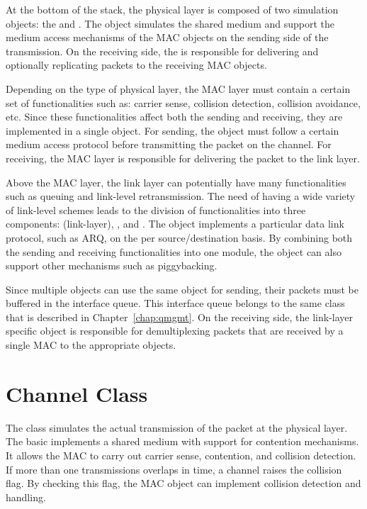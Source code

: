 At the bottom of the stack, the physical layer is composed of two
simulation objects: the  and .  The
 object simulates the shared medium and support the medium
access mechanisms of the MAC objects on the sending side of the
transmission.  On the receiving side, the  is
responsible for delivering and optionally replicating packets to the
receiving MAC objects.

Depending on the type of physical layer, the MAC layer must contain a
certain set of functionalities such as: carrier sense, collision
detection, collision avoidance, etc.  Since these functionalities affect
both the sending and receiving, they are implemented in a single
 object.  For sending, the  object must follow a certain
medium access protocol before transmitting the packet on the channel.
For receiving, the MAC layer is responsible for delivering the packet to
the link layer.

Above the MAC layer, the link layer can potentially have many
functionalities such as queuing and link-level retransmission.  The need
of having a wide variety of link-level schemes leads to the division of
functionalities into three components:  (link-layer),
, and .  The  object implements
a particular data link protocol, such as ARQ, on the per
source/destination basis.  By combining both the sending and receiving
functionalities into one module, the  object can also support
other mechanisms such as piggybacking.

Since multiple  objects can use the same  object for
sending, their packets must be buffered in the interface queue.  This
interface queue belongs to the same  class that is described
in Chapter~\ref{chap:qmgmt}.  On the receiving side, the link-layer
specific  object is responsible for demultiplexing
packets that are received by a single MAC to the appropriate 
objects.


\section{Channel Class}
\label{sec:channel}

The  class simulates the actual transmission of the packet
at the physical layer.  The basic  implements a shared
medium with support for contention mechanisms.  It allows the MAC to
carry out carrier sense, contention, and collision detection.  If more
than one transmissions overlaps in time, a channel raises the collision
flag.  By checking this flag, the MAC object can implement collision detection
and handling.

